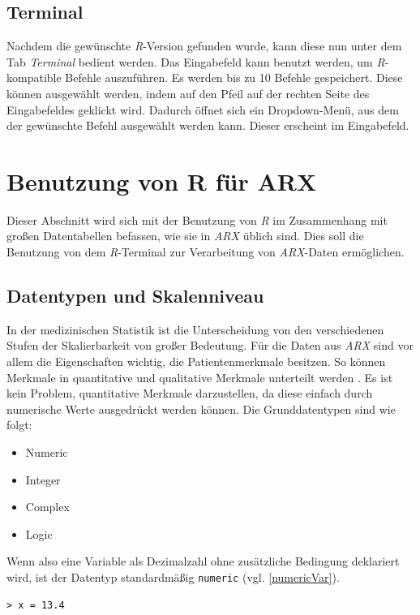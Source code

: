 \documentclass[a4paper, 12pt]{report} %
\begin{document}
\subsection{Terminal} \label{Terminal}
Nachdem die gewünschte \textit{R}-Version gefunden wurde, kann diese nun unter dem Tab \textit{Terminal} bedient werden. Das Eingabefeld kann benutzt werden, um \textit{R}-kompatible Befehle auszuführen. Es werden bis zu 10 Befehle gespeichert. Diese können ausgewählt werden, indem auf den Pfeil auf der rechten Seite des Eingabefeldes geklickt wird. Dadurch öffnet sich ein Dropdown-Menü, aus dem der gewünschte Befehl ausgewählt werden kann. Dieser erscheint im Eingabefeld. 


\section{Benutzung von R für ARX } \label{NutzungArx}
Dieser Abschnitt wird sich mit der Benutzung von \textit{R} im Zusammenhang mit großen Datentabellen befassen, wie sie in \textit{ARX} üblich sind. Dies soll die Benutzung von dem \textit{R}-Terminal zur Verarbeitung von \textit{ARX}-Daten ermöglichen. 


\subsection{Datentypen und Skalenniveau}\label{Skalen}
In der medizinischen Statistik ist die Unterscheidung von den verschiedenen Stufen der Skalierbarkeit von großer Bedeutung. Für die Daten aus \textit{ARX} sind vor allem die Eigenschaften wichtig, die Patientenmerkmale besitzen. So können Merkmale in quantitative und qualitative Merkmale unterteilt werden \cite{skalenniveau}. Es ist kein Problem, quantitative Merkmale darzustellen, da diese einfach durch numerische Werte ausgedrückt werden können. Die Grunddatentypen sind wie folgt:

\begin{itemize}
\item Numeric
\item Integer
\item Complex
\item Logic
\end{itemize}

Wenn also eine Variable als Dezimalzahl ohne zusätzliche Bedingung deklariert wird, ist der Datentyp standardmäßig \texttt{numeric} (vgl. \ref{numericVar}).

\lstset{language=R}
\begin{lstlisting}[frame=single,caption={Deklarierung einer numerischen Variable x}]
> x = 13.4
\end{lstlisting}
\label{numericVar}
\end{document}
